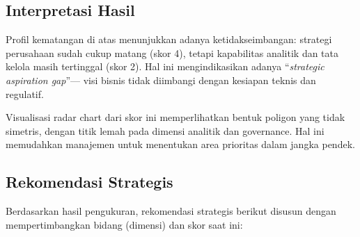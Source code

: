 \subsection*{Interpretasi Hasil}
Profil kematangan di atas menunjukkan adanya ketidakseimbangan: 
strategi perusahaan sudah cukup matang (skor 4), tetapi kapabilitas analitik dan tata kelola 
masih tertinggal (skor 2). Hal ini mengindikasikan adanya “\textit{strategic aspiration gap}”—
visi bisnis tidak diimbangi dengan kesiapan teknis dan regulatif.  

Visualisasi radar chart dari skor ini memperlihatkan bentuk poligon yang tidak simetris, 
dengan titik lemah pada dimensi analitik dan governance.  
Hal ini memudahkan manajemen untuk menentukan area prioritas dalam jangka pendek.

\subsection*{Rekomendasi Strategis}

Berdasarkan hasil pengukuran, rekomendasi strategis berikut disusun dengan mempertimbangkan 
bidang (dimensi) dan skor saat ini:

